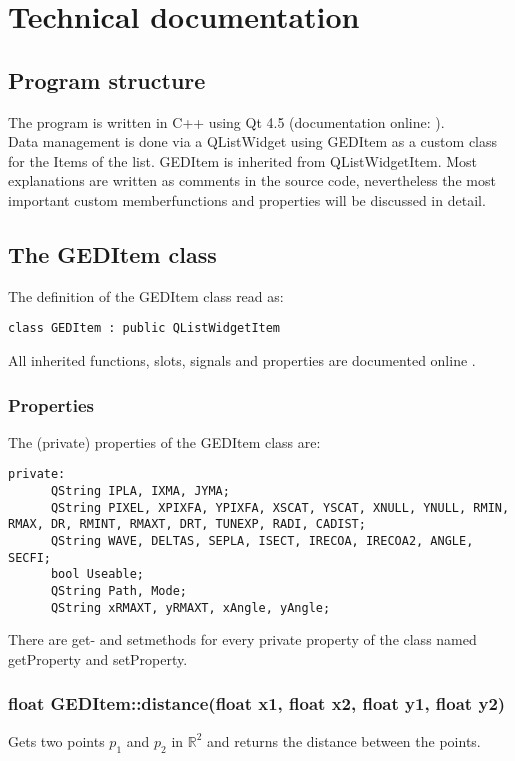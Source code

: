 \section{Technical documentation}
\subsection{Program structure}
The program is written in C++ using Qt 4.5 (documentation online: \cite{qtdoc}).\\
 Data management is done via a QListWidget using GEDItem as a custom class for the Items of the list. GEDItem is inherited from QListWidgetItem. Most explanations are written as comments in the source code, nevertheless the most important custom memberfunctions and properties will be discussed in detail. \\
 
 
\subsection{The GEDItem class}
The definition of the GEDItem class read as: 
\begin{lstlisting}
class GEDItem : public QListWidgetItem
\end{lstlisting}
All inherited functions, slots, signals and properties are documented online \cite{qtdoc}.     \\
\subsubsection{Properties} 
 The (private) properties of the GEDItem class are: 
\begin{lstlisting}
private: 
      QString IPLA, IXMA, JYMA;
      QString PIXEL, XPIXFA, YPIXFA, XSCAT, YSCAT, XNULL, YNULL, RMIN, RMAX, DR, RMINT, RMAXT, DRT, TUNEXP, RADI, CADIST;
      QString WAVE, DELTAS, SEPLA, ISECT, IRECOA, IRECOA2, ANGLE, SECFI;
      bool Useable;
      QString Path, Mode;
      QString xRMAXT, yRMAXT, xAngle, yAngle;
\end{lstlisting}
There are get- and setmethods for every private property of the class named getProperty and setProperty. 
\subsubsection{float GEDItem::distance(float x1, float x2, float y1, float y2)} 
Gets two points $p_1$ and $p_2$ in $\mathbb{R}^2$ and returns the distance between the points. 

